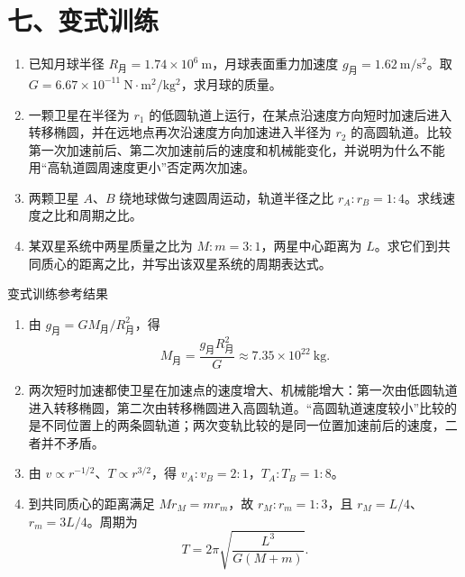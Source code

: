\section*{七、变式训练}

\begin{enumerate}
  \item 已知月球半径 $R_{\text{月}} = 1.74 \times 10^6\ \mathrm{m}$，月球表面重力加速度 $g_{\text{月}} = 1.62\ \mathrm{m/s^2}$。取 $G=6.67\times10^{-11}\ \mathrm{N\cdot m^2/kg^2}$，求月球的质量。

  \item 一颗卫星在半径为 $r_1$ 的低圆轨道上运行，在某点沿速度方向短时加速后进入转移椭圆，并在远地点再次沿速度方向加速进入半径为 $r_2$ 的高圆轨道。比较第一次加速前后、第二次加速前后的速度和机械能变化，并说明为什么不能用“高轨道圆周速度更小”否定两次加速。

  \item 两颗卫星 $A$、$B$ 绕地球做匀速圆周运动，轨道半径之比 $r_A : r_B = 1 : 4$。求线速度之比和周期之比。
  \begin{center}
  
  \end{center}

  \item 某双星系统中两星质量之比为 $M:m=3:1$，两星中心距离为 $L$。求它们到共同质心的距离之比，并写出该双星系统的周期表达式。
\end{enumerate}

\begin{learningbox}{变式训练参考结果}
\begin{enumerate}[itemsep=0.45em,topsep=0.3em,parsep=0pt]
  \item 由 $g_{\text{月}}=GM_{\text{月}}/R_{\text{月}}^2$，得
  \[
  M_{\text{月}}=\frac{g_{\text{月}}R_{\text{月}}^2}{G}
  \approx7.35\times10^{22}\ \mathrm{kg}.
  \]
  \item 两次短时加速都使卫星在加速点的速度增大、机械能增大：第一次由低圆轨道进入转移椭圆，第二次由转移椭圆进入高圆轨道。“高圆轨道速度较小”比较的是不同位置上的两条圆轨道；两次变轨比较的是同一位置加速前后的速度，二者并不矛盾。
  \item 由 $v\propto r^{-1/2}$、$T\propto r^{3/2}$，得
  $v_A:v_B=2:1$，$T_A:T_B=1:8$。
  \item 到共同质心的距离满足 $Mr_M=mr_m$，故
  $r_M:r_m=1:3$，且 $r_M=L/4$、$r_m=3L/4$。周期为
  \[
  T=2\pi\sqrt{\frac{L^3}{G(M+m)}}.
  \]
\end{enumerate}
\end{learningbox}

